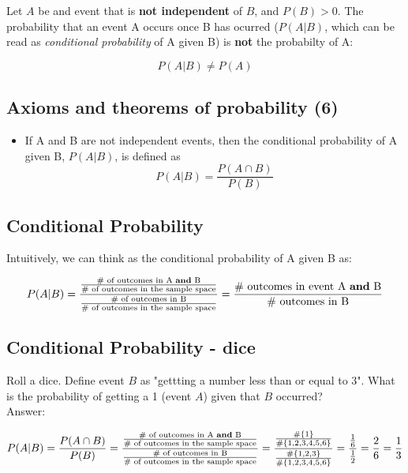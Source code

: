 \documentclass[11pt]{article}
\begin{document}
	Let $A$ be and event that is \textbf{not independent} of $B$, and $P(B)>0$. The probability that an event A occurs once B has ocurred ($P(A|B)$, which can be read as \emph{conditional probability} of A given B) is \textbf{not} the probabilty of A:
	
	\[P(A|B) \neq P(A)\]
	
	\subsection*{Axioms and theorems of probability (6)}
	\begin{itemize}
		\item If A and B are not independent events, then the conditional probability of A given B, $P(A|B)$, is defined as
	\[P(A|B) = \frac{P(A\cap B)}{P(B)}\]
 
	\end{itemize}

	\subsection*{Conditional Probability}
	Intuitively, we can think as the conditional probability of A given B as:

		\[P(A|B) = \frac{
						\frac{
							\text{\# of outcomes in A \textbf{and} B}
							}
							{\text{\# of outcomes in the sample space}
							}
						}
						{
						\frac{
							\text{\# of outcomes in B}
							}
							{\text{\# of outcomes in the sample space}
							}
						}
		=\frac{\text{\# outcomes in event A \textbf{and} B}}
							{\text{\# outcomes in B}
							}\]



	\subsection*{Conditional Probability - dice}
	
	Roll a dice. Define event $B$ as "gettting a number less than or equal to 3". What is the probability of getting a 1 (event $A$) given that $B$ occurred?\\
	 
	Answer:

	\[P(A|B) = \frac{P(A\cap B)}{P(B)} = 
	\frac{
						\frac{
							\text{\# of outcomes in A \textbf{and} B}
							}
							{\text{\# of outcomes in the sample space}
							}
						}
						{
						\frac{
							\text{\# of outcomes in B}
							}
							{\text{\# of outcomes in the sample space}
							}
						} =
						\frac
							{\frac{\#\{1\}}{\#\{1,2,3,4,5,6\}}}
							{\frac{\#\{1,2,3\}}{\#\{1,2,3,4,5,6\}}} = 
							\frac{\frac{1}{6}}{\frac{1}{2}} = \frac{2}{6} = \frac{1}{3}\]
	
\end{document}
